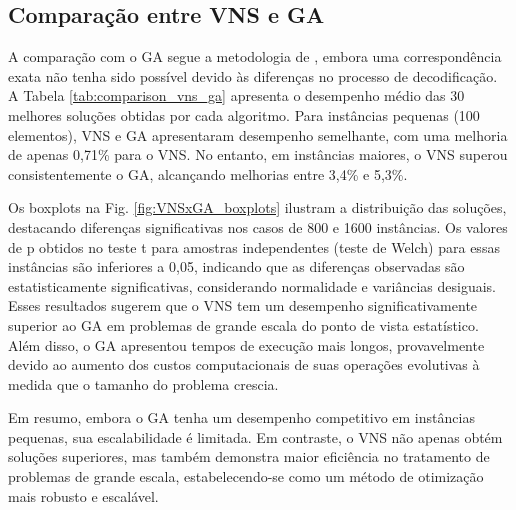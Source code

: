 \documentclass[a4paper]{ifacconf}
\begin{document}
\subsection{Comparação entre VNS e GA}

A comparação com o GA segue a metodologia de \cite{rajabi2023utilizing}, embora uma correspondência exata não tenha sido possível devido às diferenças no processo de decodificação.
A Tabela \ref{tab:comparison_vns_ga} apresenta o desempenho médio das 30 melhores soluções obtidas por cada algoritmo. Para instâncias pequenas (100 elementos), VNS e GA apresentaram desempenho semelhante,
com uma melhoria de apenas 0,71\% para o VNS. No entanto, em instâncias maiores, o VNS superou consistentemente o GA, alcançando melhorias entre 3,4\% e 5,3\%.

Os boxplots na Fig. \ref{fig:VNSxGA_boxplots} ilustram a distribuição das soluções, destacando diferenças significativas nos casos de 800 e 1600 instâncias. Os valores de p obtidos no teste t para amostras 
independentes (teste de Welch) para essas instâncias são inferiores a 0,05, indicando que as diferenças observadas são estatisticamente significativas, considerando normalidade e variâncias desiguais. 
Esses resultados sugerem que o VNS tem um desempenho significativamente superior ao GA em problemas de grande escala do ponto de vista estatístico. Além disso, o GA apresentou tempos de execução mais 
longos, provavelmente devido ao aumento dos custos computacionais de suas operações evolutivas à medida que o tamanho do problema crescia.

Em resumo, embora o GA tenha um desempenho competitivo em instâncias pequenas, sua escalabilidade é limitada. Em contraste, o VNS não apenas obtém soluções superiores,
mas também demonstra maior eficiência no tratamento de problemas de grande escala, estabelecendo-se como um método de otimização mais robusto e escalável.
\end{document}
